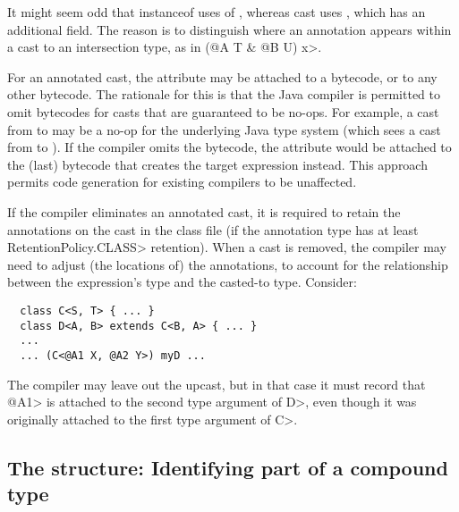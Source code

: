 \documentclass[10pt]{article}
\newcommand{\preverbnegspace}{\vspace{-5pt}}
\begin{document}
It might seem odd that instanceof uses  of
, whereas cast uses ,
which has an additional  field.  The reason is
to distinguish where an annotation appears within a cast to an intersection
type, as in \<(@A T \& @B U) x>.

For an annotated cast, the attribute may be attached to a
 bytecode, or to any other bytecode.  The rationale for
this is that the Java compiler is permitted to omit 
bytecodes for casts that are guaranteed to be no-ops.  For example, a
cast from  to  may be a no-op for the
underlying Java type system (which sees a cast from  to
).  If the compiler omits the  bytecode, the
 attribute would be attached to the (last) bytecode that
creates the target expression instead.  This approach permits code
generation for existing compilers to be unaffected.

If the compiler eliminates an annotated cast, it is required to retain the
annotations on the cast in the class file (if the annotation type has at
least \<RetentionPolicy.CLASS> retention).  When a cast is removed, the
compiler may need to adjust (the locations of) the annotations, to account
for the relationship between the expression's type and the casted-to type.
Consider:

\preverbnegspace
\begin{Verbatim}
  class C<S, T> { ... }
  class D<A, B> extends C<B, A> { ... }
  ...
  ... (C<@A1 X, @A2 Y>) myD ...
\end{Verbatim}

\noindent
The compiler may leave out the upcast, but in that case it must record that
\<@A1> is attached to the second type argument of \<D>, even though it was
originally attached to the first type argument of \<C>.





\subsection{The  structure:  Identifying part of a compound type\label{class-file:ext:type_path}}

\newcommand{\tpath}[2]{\codefootnotesize{path\_length: #1; path: [#2]}}
\newcommand{\tarray}{\codefootnotesize{ARRAY(0, 0)}}
\newcommand{\tinner}{\codefootnotesize{INNER\_TYPE(1, 0)}}
\newcommand{\twildcard}{\codefootnotesize{WILDCARD(2, 0)}}
\newcommand{\ttypearg}[1]{\codefootnotesize{TYPE\_ARGUMENT(3, #1)}}
\end{document}

